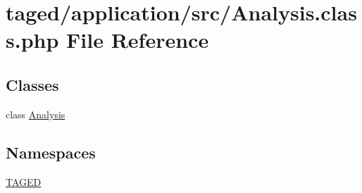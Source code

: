 \hypertarget{_analysis_8class_8php}{}\section{taged/application/src/\+Analysis.class.\+php File Reference}
\label{_analysis_8class_8php}
\subsection*{Classes}
\begin{DoxyCompactItemize}
\item 
class \hyperlink{class_analysis}{Analysis}
\end{DoxyCompactItemize}
\subsection*{Namespaces}
\begin{DoxyCompactItemize}
\item 
 \hyperlink{namespace_t_a_g_e_d}{T\+A\+G\+ED}
\end{DoxyCompactItemize}
